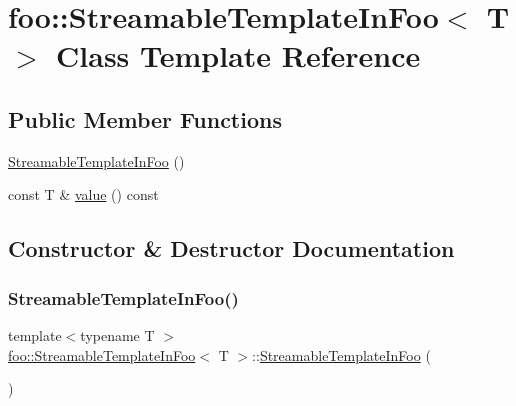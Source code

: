 \hypertarget{classfoo_1_1StreamableTemplateInFoo}{}\section{foo\+::Streamable\+Template\+In\+Foo$<$ T $>$ Class Template Reference}
\label{classfoo_1_1StreamableTemplateInFoo}
\subsection*{Public Member Functions}
\begin{DoxyCompactItemize}
\item 
\mbox{\hyperlink{classfoo_1_1StreamableTemplateInFoo_a0e5d7147d321adf8a2ec348243da70ea}{Streamable\+Template\+In\+Foo}} ()
\item 
const T \& \mbox{\hyperlink{classfoo_1_1StreamableTemplateInFoo_aa6e29a9a298014ce74c65423b6985023}{value}} () const
\end{DoxyCompactItemize}


\subsection{Constructor \& Destructor Documentation}
\mbox{\label{classfoo_1_1StreamableTemplateInFoo_a0e5d7147d321adf8a2ec348243da70ea}} 
\subsubsection{\texorpdfstring{StreamableTemplateInFoo()}{StreamableTemplateInFoo()}}
{\footnotesize\ttfamily template$<$typename T $>$ \\
\mbox{\hyperlink{classfoo_1_1StreamableTemplateInFoo}{foo\+::\+Streamable\+Template\+In\+Foo}}$<$ T $>$\+::\mbox{\hyperlink{classfoo_1_1StreamableTemplateInFoo}{Streamable\+Template\+In\+Foo}} (\begin{DoxyParamCaption}{ }\end{DoxyParamCaption})\hspace{0.3cm}{\ttfamily [inline]}}



